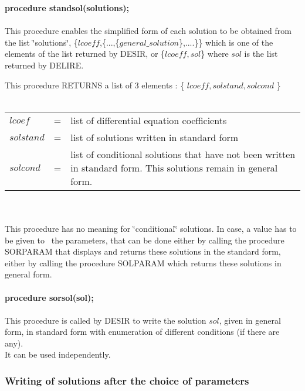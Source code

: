 {\bf procedure standsol(solutions);} \\
\ \\
This procedure enables the simplified form of each solution to be obtained
from the list \char`\"{}solutions\char`\"{}, \{$lcoeff$,\{...,\{$general\_solution$\},....\}\}
which is one of the elements of the list returned by DESIR, or \{$lcoeff,sol$\} where
$sol$ is the list returned by DELIRE. \par
This procedure RETURNS a list of 3 elements : \{ $lcoeff, solstand, solcond$ \} \\
\ \\
\begin{tabular}{lcp{9cm}}
$lcoef$ & = & list of differential equation coefficients \\
$solstand$ & = & list of solutions written in standard form \\
$solcond$ & = & list of conditional solutions that have not been written
              in standard form. This solutions remain in general form. \\
\end{tabular} \\
\ \\
This procedure has no meaning for \char`\"{}conditional\char`\"{} solutions.
In case, a value has to be given to~ the parameters, that can be done either by 
calling the procedure SORPARAM that displays and returns these solutions in the
standard form, either by calling the procedure SOLPARAM which returns
these solutions in general form. \\
\ \\
{\bf procedure sorsol(sol);} \\
\ \\
This procedure is called by DESIR to write the solution $sol$, given in
general form, in standard form with enumeration of different conditions (if
there are any). \\
It can be used independently.

\subsubsection{Writing of solutions after the choice of parameters}

